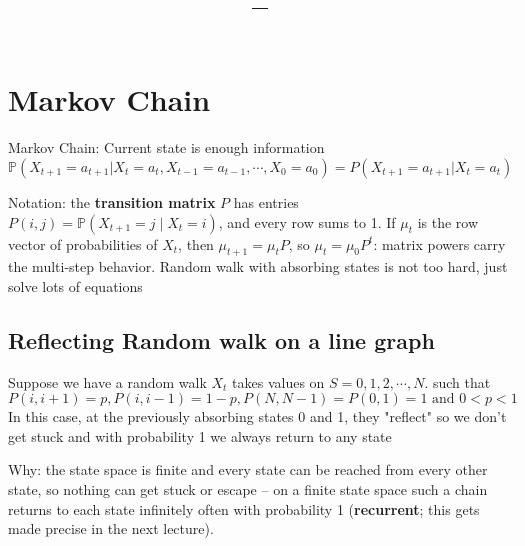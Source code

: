 \documentclass[11pt]{article}
\title{\vspace{-1.5em}\textbf{\coursename -- \lecturetitle}}
\author{\studentname}
\date{\lecturedate}
\newcommand{\1}{\mathbf{1}}
\theoremstyle{notestyle}
\theoremstyle{definition}
\begin{document}
\maketitle

\section{Markov Chain}
Markov Chain: Current state is enough information 
$$\mathbb{P}(X_{t+1}=a_{t+1} | X_{t} = a_t, X_{t-1} = a_{t-1}, \cdots, X_{0} = a_0) =
P(X_{t + 1} = a_{t + 1} | X_t = a_{t})$$
\par Notation: the \textbf{transition matrix} $P$ has entries $P(i, j) =
\mathbb{P}(X_{t+1} = j \mid X_t = i)$, and every row sums to 1. If $\mu_t$ is the
row vector of probabilities of $X_t$, then $\mu_{t+1} = \mu_t P$, so $\mu_t =
\mu_0 P^t$: matrix powers carry the multi-step behavior.
Random walk with absorbing states is not too hard, just solve lots of equations
\subsection{Reflecting Random walk on a line graph}
Suppose we have a random walk $X_t$ takes values on $S = {0, 1, 2, \cdots, N}.$ such that $$P(i, i + 1) = p,
P(i, i - 1) = 1 - p, P(N, N - 1) = P(0, 1) = 1 \text{ and } 0 < p < 1$$
In this case, at the previously absorbing states 0 and 1, they "reflect" so we don't get
stuck and with probability 1 we always return to any state
\par Why: the state space is finite and every state can be reached from every other
state, so nothing can get stuck or escape -- on a finite state space such a chain
returns to each state infinitely often with probability 1 (\textbf{recurrent}; this
gets made precise in the next lecture).
\end{document}
